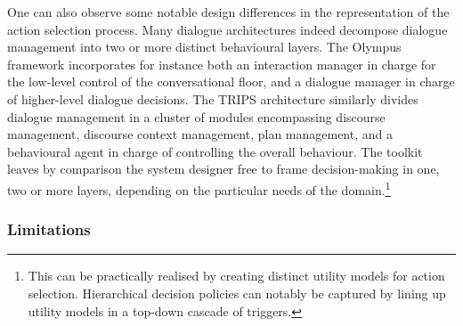 One can also observe some notable design differences in the representation of the action selection process. Many dialogue architectures indeed decompose dialogue management into two or more distinct behavioural layers.  The Olympus framework incorporates for instance both an interaction manager in charge for the low-level control of the conversational floor, and a dialogue manager in charge of higher-level dialogue decisions.  The TRIPS architecture similarly divides dialogue management in a cluster of modules encompassing discourse management, discourse context management, plan management, and a behavioural agent in charge of controlling the overall behaviour. The \opendial{} toolkit leaves by comparison the system designer free to frame decision-making in one, two or more layers, depending on the particular needs of the domain.\footnote{This can be practically realised by creating distinct utility models for action selection.  Hierarchical decision policies can notably be captured by lining up utility models in a top-down cascade of triggers.}



\subsubsection*{Limitations}

